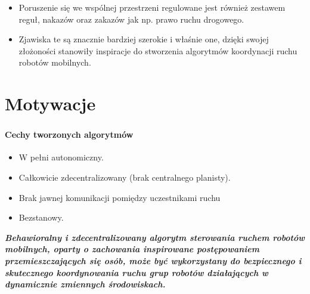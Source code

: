 \documentclass{beamer}
\begin{document}
\begin{frame}
{\begin{itemize}
	\item Poruszenie się we wspólnej przestrzeni regulowane jest również zestawem reguł, nakazów oraz zakazów jak np. prawo ruchu drogowego.
	
	\item Zjawiska te są znacznie bardziej szerokie i właśnie one, dzięki swojej złożoności stanowiły inspiracje do stworzenia algorytmów koordynacji ruchu robotów mobilnych.
\end{itemize}
}

\end{frame}

\section*{Motywacje}
\begin{frame}
\frametitle{\secname}
\framesubtitle{Cechy tworzonych algorytmów}

\begin{itemize}
	\item W pełni autonomiczny.
	\item Całkowicie zdecentralizowany (brak centralnego planisty).
	\item Brak jawnej komunikacji pomiędzy uczestnikami ruchu
	\item Bezstanowy.
\end{itemize}


\begin{center}
	\textbf{\textit{Behawioralny i zdecentralizowany algorytm sterowania ruchem robotów mobilnych, oparty o zachowania inspirowane postępowaniem przemieszczających się osób, może być wykorzystany do bezpiecznego i skutecznego koordynowania ruchu grup robotów działających w dynamicznie zmiennych środowiskach.}}
\end{center}


\end{frame}
\end{document}
